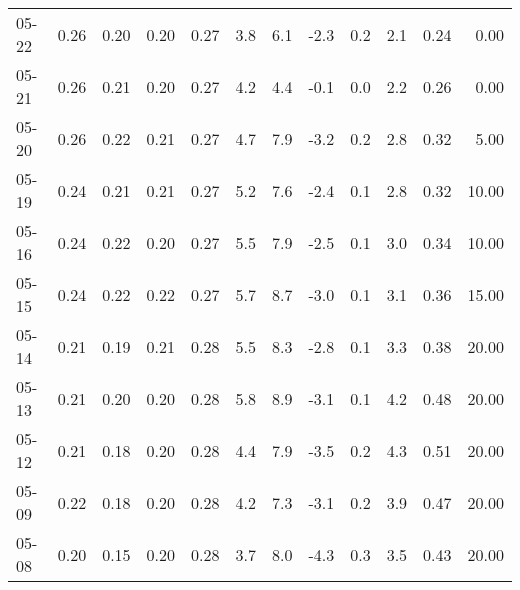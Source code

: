 \begin{threeparttable}
{\begin{tabular}{lrrrrrrrrrrr}
  05-22 &          0.26 &          0.20 &          0.20 &        0.27 &                 3.8 &                 6.1 &       -2.3 &                 0.2 &              2.1 &            0.24 &                   0.00 \\
  05-21 &          0.26 &          0.21 &          0.20 &        0.27 &                 4.2 &                 4.4 &       -0.1 &                 0.0 &              2.2 &            0.26 &                   0.00 \\
  05-20 &          0.26 &          0.22 &          0.21 &        0.27 &                 4.7 &                 7.9 &       -3.2 &                 0.2 &              2.8 &            0.32 &                   5.00 \\
  05-19 &          0.24 &          0.21 &          0.21 &        0.27 &                 5.2 &                 7.6 &       -2.4 &                 0.1 &              2.8 &            0.32 &                  10.00 \\
  05-16 &          0.24 &          0.22 &          0.20 &        0.27 &                 5.5 &                 7.9 &       -2.5 &                 0.1 &              3.0 &            0.34 &                  10.00 \\
  05-15 &          0.24 &          0.22 &          0.22 &        0.27 &                 5.7 &                 8.7 &       -3.0 &                 0.1 &              3.1 &            0.36 &                  15.00 \\
  05-14 &          0.21 &          0.19 &          0.21 &        0.28 &                 5.5 &                 8.3 &       -2.8 &                 0.1 &              3.3 &            0.38 &                  20.00 \\
  05-13 &          0.21 &          0.20 &          0.20 &        0.28 &                 5.8 &                 8.9 &       -3.1 &                 0.1 &              4.2 &            0.48 &                  20.00 \\
  05-12 &          0.21 &          0.18 &          0.20 &        0.28 &                 4.4 &                 7.9 &       -3.5 &                 0.2 &              4.3 &            0.51 &                  20.00 \\
  05-09 &          0.22 &          0.18 &          0.20 &        0.28 &                 4.2 &                 7.3 &       -3.1 &                 0.2 &              3.9 &            0.47 &                  20.00 \\
  05-08 &          0.20 &          0.15 &          0.20 &        0.28 &                 3.7 &                 8.0 &       -4.3 &                 0.3 &              3.5 &            0.43 &                  20.00 \\

\end{tabular}}
\end{threeparttable}
